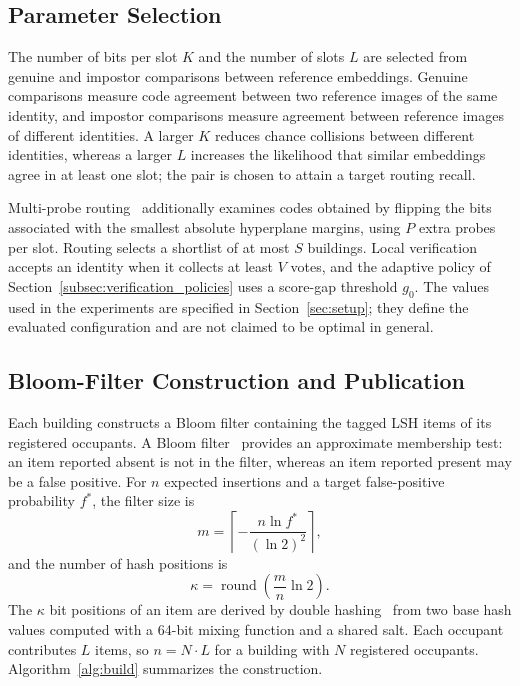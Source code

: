 \documentclass[pdflatex,sn-mathphys-num]{sn-jnl}%
\theoremstyle{thmstyleone}%
\theoremstyle{thmstyletwo}%
\theoremstyle{thmstylethree}%
\begin{document}
\subsection{Parameter Selection}
\label{subsec:parameter_selection}

The number of bits per slot $K$ and the number of slots $L$ are selected from genuine and impostor comparisons between reference embeddings. Genuine comparisons measure code agreement between two reference images of the same identity, and impostor comparisons measure agreement between reference images of different identities. A larger $K$ reduces chance collisions between different identities, whereas a larger $L$ increases the likelihood that similar embeddings agree in at least one slot; the pair is chosen to attain a target routing recall.

Multi-probe routing~\cite{lv2007} additionally examines codes obtained by flipping the bits associated with the smallest absolute hyperplane margins, using $P$ extra probes per slot. Routing selects a shortlist of at most $S$ buildings. Local verification accepts an identity when it collects at least $V$ votes, and the adaptive policy of Section~\ref{subsec:verification_policies} uses a score-gap threshold $g_0$. The values used in the experiments are specified in Section~\ref{sec:setup}; they define the evaluated configuration and are not claimed to be optimal in general.

\subsection{Bloom-Filter Construction and Publication}
\label{subsec:bloom_filter}

Each building constructs a Bloom filter containing the tagged LSH items of its registered occupants. A Bloom filter~\cite{bloom1970} provides an approximate membership test: an item reported absent is not in the filter, whereas an item reported present may be a false positive. For $n$ expected insertions and a target false-positive probability $f^*$, the filter size is
\begin{equation}
    m =
    \left\lceil
    -\frac{n\ln f^*}{(\ln 2)^2}
    \right\rceil,
    \label{eq:bloom_size}
\end{equation}
and the number of hash positions is
\begin{equation}
    \kappa =
    \operatorname{round}
    \left(\frac{m}{n}\ln 2\right).
    \label{eq:bloom_hash_count}
\end{equation}
The $\kappa$ bit positions of an item are derived by double hashing~\cite{kirsch2006} from two base hash values computed with a 64-bit mixing function and a shared salt. Each occupant contributes $L$ items, so $n=N\cdot L$ for a building with $N$ registered occupants. Algorithm~\ref{alg:build} summarizes the construction.
\end{document}
